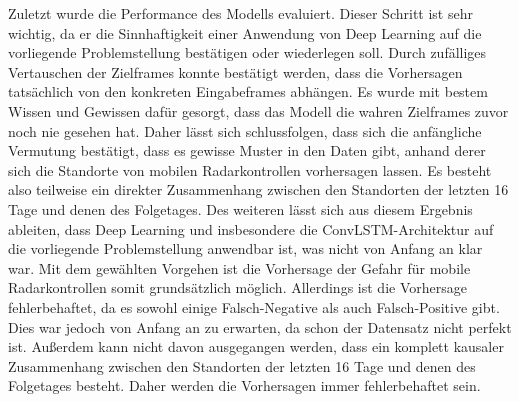 Zuletzt wurde die Performance des Modells evaluiert.
Dieser Schritt ist sehr wichtig, da er die Sinnhaftigkeit einer Anwendung von Deep Learning auf die vorliegende Problemstellung bestätigen oder wiederlegen soll.
Durch zufälliges Vertauschen der Zielframes konnte bestätigt werden, dass die Vorhersagen tatsächlich von den konkreten Eingabeframes abhängen.
Es wurde mit bestem Wissen und Gewissen dafür gesorgt, dass das Modell die wahren Zielframes zuvor noch nie gesehen hat.
Daher lässt sich schlussfolgen, dass sich die anfängliche Vermutung bestätigt, dass es gewisse Muster in den Daten gibt, anhand derer sich die Standorte von mobilen Radarkontrollen vorhersagen lassen.
Es besteht also teilweise ein direkter Zusammenhang zwischen den Standorten der letzten 16 Tage und denen des Folgetages.
Des weiteren lässt sich aus diesem Ergebnis ableiten, dass Deep Learning und insbesondere die ConvLSTM-Architektur auf die vorliegende Problemstellung anwendbar ist, was nicht von Anfang an klar war.
Mit dem gewählten Vorgehen ist die Vorhersage der Gefahr für mobile Radarkontrollen somit grundsätzlich möglich.
Allerdings ist die Vorhersage fehlerbehaftet, da es sowohl einige Falsch-Negative als auch Falsch-Positive gibt.
Dies war jedoch von Anfang an zu erwarten, da schon der Datensatz nicht perfekt ist.
Außerdem kann nicht davon ausgegangen werden, dass ein komplett kausaler Zusammenhang zwischen den Standorten der letzten 16 Tage und denen des Folgetages besteht.
Daher werden die Vorhersagen immer fehlerbehaftet sein.


